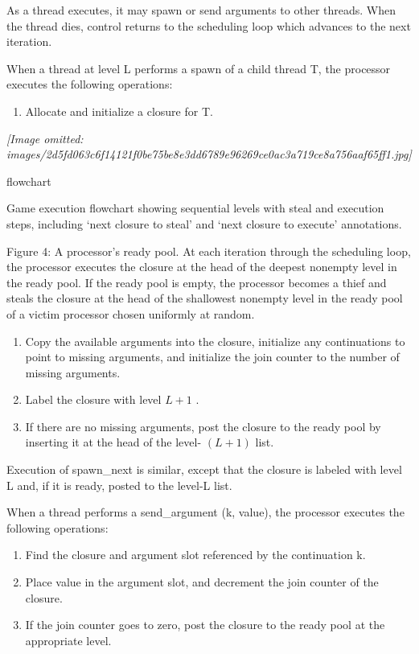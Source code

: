 \documentclass[
]{article}
\newcounter{none} %
\providecommand{\tightlist}{%
  \setlength{\itemsep}{0pt}\setlength{\parskip}{0pt}}
\begin{document}
As a thread executes, it may spawn or send arguments to other threads.
When the thread dies, control returns to the scheduling loop which
advances to the next iteration.

When a thread at level L performs a spawn of a child thread T, the
processor executes the following operations:

\begin{enumerate}
\def\labelenumi{\arabic{enumi}.}
\tightlist
\item
  Allocate and initialize a closure for T.
\end{enumerate}

\textit{[Image omitted: images/2d5fd063c6f14121f0be75be8e3dd6789e96269ce0ac3a719ce8a756aaf65ff1.jpg]}

flowchart

Game execution flowchart showing sequential levels with steal and
execution steps, including `next closure to steal' and `next closure to
execute' annotations.

Figure 4: A processor's ready pool. At each iteration through the
scheduling loop, the processor executes the closure at the head of the
deepest nonempty level in the ready pool. If the ready pool is empty,
the processor becomes a thief and steals the closure at the head of the
shallowest nonempty level in the ready pool of a victim processor chosen
uniformly at random.

\begin{enumerate}
\def\labelenumi{\arabic{enumi}.}
\setcounter{enumi}{1}
\tightlist
\item
  Copy the available arguments into the closure, initialize any
  continuations to point to missing arguments, and initialize the join
  counter to the number of missing arguments.\\
\item
  Label the closure with level \(L + 1\) .\\
\item
  If there are no missing arguments, post the closure to the ready pool
  by inserting it at the head of the level- \((L+1)\) list.
\end{enumerate}

Execution of spawn\_next is similar, except that the closure is labeled
with level L and, if it is ready, posted to the level-L list.

When a thread performs a send\_argument (k, value), the processor
executes the following operations:

\begin{enumerate}
\def\labelenumi{\arabic{enumi}.}
\tightlist
\item
  Find the closure and argument slot referenced by the continuation k.\\
\item
  Place value in the argument slot, and decrement the join counter of
  the closure.\\
\item
  If the join counter goes to zero, post the closure to the ready pool
  at the appropriate level.
\end{enumerate}
\end{document}
